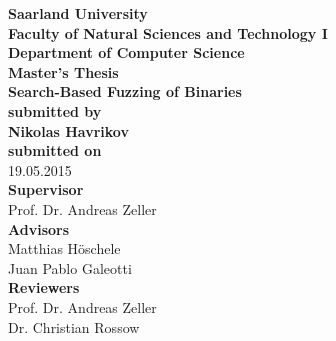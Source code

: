 \begin{titlepage}
\begin{center}
{\LARGE \bfseries Saarland University \\
Faculty of Natural Sciences and Technology I \\[0.1cm]
Department of Computer Science}\\[2.5cm]

{\Large \bfseries Master's Thesis}\\[1cm]
{\LARGE \bfseries Search-Based Fuzzing of Binaries}\\[2cm]
{\small \bfseries submitted by}\\[0.5cm]
{\large \bfseries Nikolas Havrikov}\\[1cm]
{\small \bfseries submitted on}\\
19.05.2015\\[2.5cm]
{\bfseries Supervisor}\\[0.2cm]
Prof. Dr. Andreas Zeller\\[1cm]
{\bfseries Advisors}\\[0.2cm]
Matthias Höschele\\[0.1cm]
Juan Pablo Galeotti\\[1cm]
{\bfseries Reviewers}\\[0.2cm]
Prof. Dr. Andreas Zeller\\[0.1cm]
Dr. Christian Rossow
\end{center}
\end{titlepage}